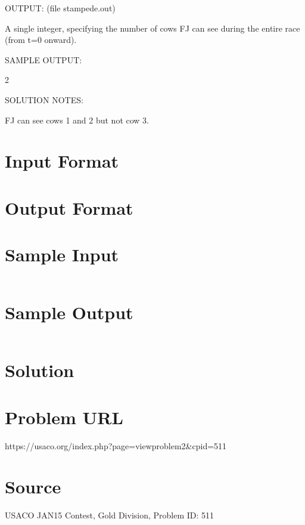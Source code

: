 \documentclass[12pt]{article}
\begin{document}
OUTPUT: (file stampede.out)

A single integer, specifying the number of cows FJ can see during the
entire race (from t=0 onward).

SAMPLE OUTPUT:

2

SOLUTION NOTES:

FJ can see cows 1 and 2 but not cow 3.




\section*{Input Format}


\section*{Output Format}


\section*{Sample Input}
\begin{verbatim}

\end{verbatim}

\section*{Sample Output}
\begin{verbatim}

\end{verbatim}

\section*{Solution}


\section*{Problem URL}
https://usaco.org/index.php?page=viewproblem2&cpid=511

\section*{Source}
USACO JAN15 Contest, Gold Division, Problem ID: 511
\end{document}
